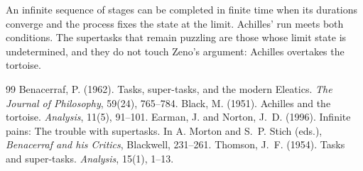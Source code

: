 \documentclass{situationist-preprint}
\begin{document}
An infinite sequence of stages can be completed in finite time when its durations converge and the process fixes the state at the limit. Achilles' run meets both conditions. The supertasks that remain puzzling are those whose limit state is undetermined, and they do not touch Zeno's argument: Achilles overtakes the tortoise.

\begin{thebibliography}{99}\small
{} Benacerraf, P. (1962). Tasks, super-tasks, and the modern Eleatics. \emph{The Journal of Philosophy}, 59(24), 765--784.
 Black, M. (1951). Achilles and the tortoise. \emph{Analysis}, 11(5), 91--101.
 Earman, J. and Norton, J.~D. (1996). Infinite pains: The trouble with supertasks. In A. Morton and S.~P. Stich (eds.), \emph{Benacerraf and his Critics}, Blackwell, 231--261.
 Thomson, J.~F. (1954). Tasks and super-tasks. \emph{Analysis}, 15(1), 1--13.
\end{thebibliography}
\end{document}
